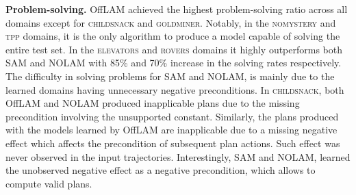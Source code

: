\documentclass{article}
\newcommand{\miniparagraph}[1]{\textbf{#1.}}
\theoremstyle{definition}
\theoremstyle{remark}
\newcommand{\sam}{\ac{SAM}\xspace}
\newcommand{\nolam}{NOLAM\xspace}
\newcommand{\offlam}{OffLAM\xspace}
\newcommand{\samshort}{SAM}
\newif\ifaddcomments
\newcommand{\roni}[1]{\ifaddcomments{\textcolor{red}{[Roni: #1]}}\fi}
\newcommand{\leo}[1]{\ifaddcomments{\textcolor{pink}{[Leonardo: #1]}}\fi}
\begin{document}
\miniparagraph{Problem-solving} 
\offlam{} achieved the highest problem-solving ratio across all domains except for \textsc{childsnack} and \textsc{goldminer}. Notably, in the \textsc{nomystery} and \textsc{tpp} domains, it is the only algorithm to produce a model capable of solving the entire test set.
In the \textsc{elevators} and \textsc{rovers} domains it highly outperforms both \samshort{} and \nolam{} with 85\% and 70\% increase in the 
solving rates respectively.
The difficulty in solving problems for \samshort{} and \nolam{}, is mainly due to the learned domains having unnecessary negative preconditions. 
In \textsc{childsnack}, both \offlam{} and \nolam{} produced inapplicable plans due to the missing precondition involving the unsupported constant.
Similarly, the plans produced with the models learned by \offlam{} are inapplicable due to a missing negative effect which affects the precondition of subsequent plan actions.
Such effect was never observed in the input trajectories. Interestingly, \sam and \nolam, learned the unobserved negative effect as a negative precondition, which allows to compute valid plans.



\end{document}
